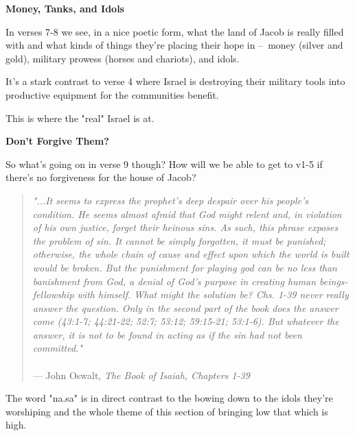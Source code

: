 \documentclass[11pt]{article}
\begin{document}
\vspace{3em}
{\large\bfseries Money, Tanks, and Idols}
\vspace{1em}

In verses 7-8 we see, in a nice poetic form, what the land of Jacob is really filled with
and what kinds of things they're placing their hope in – money (silver and gold), military prowess (horses and chariots), and idols.

{\vspace{1em}}

It's a stark contrast to verse 4 where Israel is destroying their military tools into productive equipment for the communities benefit.

This is where the "real" Israel is at.


\vspace{3em}
{\large\bfseries Don't Forgive Them?}
\vspace{1em}

So what's going on in verse 9 though? How will we be able to get to v1-5 if there's no forgiveness for the house of Jacob?

{\vspace{1em}}

\begin{quote}
\textit{"...It seems to express the prophet's deep despair over his people's condition. He seems almost afraid that God might relent and, in violation of his own justice, forget their heinous sins. As such, this phrase exposes the problem of sin. It cannot be simply forgotten, it must be punished; otherwise, the whole chain of cause and effect upon which the world is built would be broken. But the punishment for playing god can be no less than banishment from God, a denial of God's purpose in creating human beings-fellowship with himself. What might the solution be? Chs. 1-39 never really answer the question. Only in the second part of the book does the answer come (43:1-7; 44:21-22; 52:7; 53:12;
59:15-21; 53:1-6). But whatever the answer, it is not to be found in acting as if the sin had not been committed."}\\\\
\hfill --- John Oswalt, \textit{The Book of Isaiah, Chapters 1-39}
\end{quote}


The word "na.sa" is in direct contrast to the bowing down to the idols they're worshiping and the whole theme of this section of bringing low that which is high.
\end{document}
